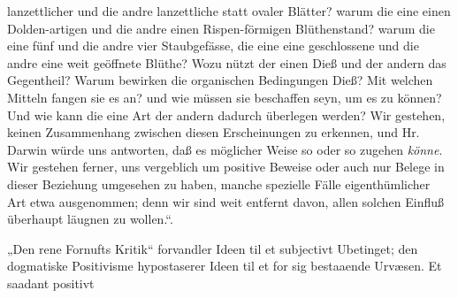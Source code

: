 \documentclass[12pt,a4paper]{book}
\begin{document}
{lanzettlicher und die andre lanzettliche statt ovaler Blätter? warum die eine
einen Dolden-artigen und die andre einen Rispen-förmigen Blüthenstand? warum
die eine fünf und die andre vier Staubgefässe, die eine eine geschlossene und
die andre eine weit geöffnete Blüthe? Wozu nützt der einen Dieß und der andern
das Gegentheil? Warum bewirken die organischen Bedingungen Dieß? Mit welchen
Mitteln fangen sie es an? und wie müssen sie beschaffen seyn, um es zu können?
Und wie kann die eine Art der andern dadurch überlegen werden? Wir gestehen,
keinen Zusammenhang zwischen diesen Erscheinungen zu erkennen, und Hr. Darwin
würde uns antworten, daß es möglicher Weise so oder so zugehen \emph{könne}.
Wir gestehen ferner, uns vergeblich um positive Beweise oder auch nur Belege in
dieser Beziehung umgesehen zu haben, manche spezielle Fälle eigenthümlicher Art
etwa ausgenommen; denn wir sind weit entfernt davon, allen solchen Einfluß
überhaupt läugnen zu wollen.“}.

„Den rene Fornufts Kritik“ forvandler Ideen til et subjectivt Ubetinget; den
dogmatiske Positivisme hypostaserer Ideen til et for sig bestaaende Urvæsen. Et
saadant positivt
\end{document}

